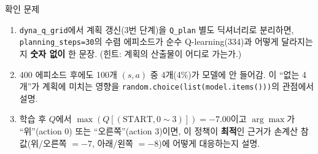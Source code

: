 \begin{frame}{확인 문제}
  \begin{enumerate}
    \item {} \texttt{dyna\_q\_grid}에서 계획 갱신(3번
      단계)을 \texttt{Q\_plan} 별도 딕셔너리로 분리하면,
      \texttt{planning\_steps=30}의 수렴 에피소드가 순수
      Q-learning(334)과 어떻게 달라지는지 \textbf{숫자 없이}
      한 문장. (힌트: 계획의 산출물이 어디로 가는가.)
    \item {} 400 에피소드 후에도 100개 $(s,a)$ 중
      4개(4\%)가 모델에 안 들어감. 이 ``없는 4개''가 계획에
      미치는 영향을 \texttt{random.choice(list(model.items()))}의
      관점에서 설명.
    \item {} 학습 후 $Q$에서
      $\max(Q[(\text{START}, 0\sim3)]) = -7.00$이고
      $\arg\max$가 ``위''(action 0) 또는 ``오른쪽''(action 3)이면,
      이 정책이 \textbf{최적}인 근거가 손계산 참값(위/오른쪽 $=-7$,
      아래/왼쪽 $=-8$)에 어떻게 대응하는지 설명.
  \end{enumerate}
\end{frame}
